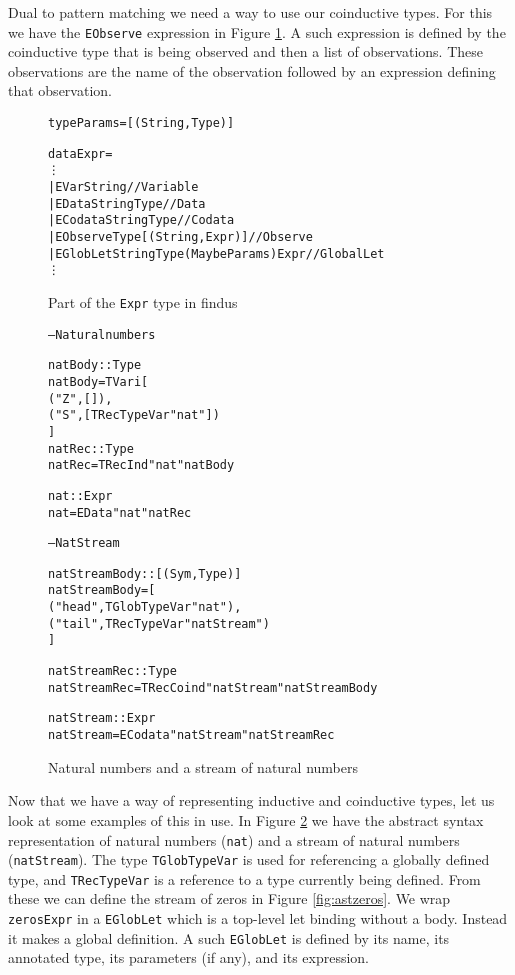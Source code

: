 Dual to pattern matching we need a way to use our coinductive types. For this we have the \texttt{EObserve} expression in Figure \ref{fig:expr}. A such expression is defined by the coinductive type that is being observed and then a list of observations. These observations are the name of the observation followed by an expression defining that observation.

\begin{figure}
\begin{alltt}
type Params = [(String, Type)]

data Expr =
  \vdots
  | EVar String                              // Variable
  | EData String Type                        // Data
  | ECodata String Type                      // Codata
  | EObserve Type [(String, Expr)]           // Observe
  | EGlobLet String Type (Maybe Params) Expr // Global Let
  \vdots
\end{alltt}
\caption{Part of the \texttt{Expr} type in findus}
\label{fig:expr}
\end{figure}

\begin{figure}
\begin{alltt}
-- Natural numbers

natBody :: Type
natBody = TVari [
            ("Z", []), 
            ("S", [TRecTypeVar "nat"])
          ]
natRec :: Type
natRec = TRecInd "nat" natBody

nat :: Expr
nat = EData "nat" natRec

-- Nat Stream

natStreamBody :: [(Sym, Type)]
natStreamBody = [
                  ("head", TGlobTypeVar "nat"),
                  ("tail", TRecTypeVar "natStream")
                ]

natStreamRec :: Type
natStreamRec = TRecCoind "natStream" natStreamBody

natStream :: Expr
natStream = ECodata "natStream" natStreamRec
\end{alltt}
\caption{Natural numbers and a stream of natural numbers}
\label{fig:natandstream}
\end{figure}

Now that we have a way of representing inductive and coinductive types, let us look at some examples of this in use. In Figure \ref{fig:natandstream} we have the abstract syntax representation of natural numbers (\texttt{nat}) and a stream of natural numbers (\texttt{natStream}). The type \texttt{TGlobTypeVar} is used for referencing a globally defined type, and \texttt{TRecTypeVar} is a reference to a type currently being defined. From these we can define the stream of zeros in Figure \ref{fig:astzeros}. We wrap \texttt{zerosExpr} in a \texttt{EGlobLet} which is a top-level let binding without a body. Instead it makes a global definition. A such \texttt{EGlobLet} is defined by its name, its annotated type, its parameters (if any), and its expression.

